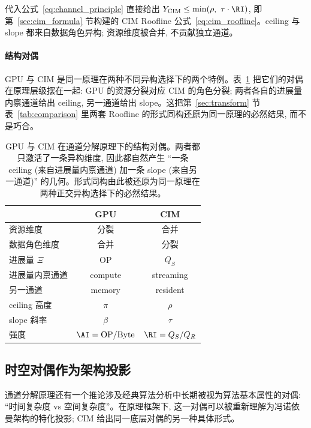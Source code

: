 代入公式~\eqref{eq:channel_principle} 直接给出 $Y_{\mathrm{CIM}} \le \min(\rho,\ \tau \cdot \RI)$, 即第~\ref{sec:cim_formula} 节构建的 CIM Roofline 公式~\eqref{eq:cim_roofline}。ceiling 与 slope 都来自数据角色异构; 资源维度被合并, 不贡献独立通道。

\paragraph{结构对偶}
GPU 与 CIM 是同一原理在两种不同异构选择下的两个特例。表~\ref{tab:dual_projections} 把它们的对偶在原理层级摆在一起: GPU 的资源分裂对应 CIM 的角色分裂; 两者各自的进展量内禀通道给出 ceiling, 另一通道给出 slope。这把第~\ref{sec:transform} 节表~\ref{tab:comparison} 里两套 Roofline 的形式同构还原为同一原理的必然结果, 而不是巧合。

\begin{table}[h!]
\centering
\small
\renewcommand{\arraystretch}{1.3}
\begin{tabular}{@{} l c c @{}}
\toprule
& \textbf{GPU} & \textbf{CIM} \\
\midrule
资源维度          & 分裂          & 合并 \\
数据角色维度      & 合并          & 分裂 \\
\midrule
进展量 $\Xi$      & $\mathrm{OP}$ & $Q_S$ \\
进展量内禀通道    & compute       & streaming \\
另一通道          & memory        & resident \\
\midrule
ceiling 高度      & $\pi$         & $\rho$ \\
slope 斜率        & $\beta$       & $\tau$ \\
强度              & $\AI = \mathrm{OP}/\mathrm{Byte}$ & $\RI = Q_S/Q_R$ \\
\bottomrule
\end{tabular}
\caption{GPU 与 CIM 在通道分解原理下的结构对偶。两者都只激活了一条异构维度, 因此都自然产生 “一条 ceiling (来自进展量内禀通道) 加一条 slope (来自另一通道)” 的几何。形式同构由此被还原为同一原理在两种正交异构选择下的必然结果。}
\label{tab:dual_projections}
\end{table}

\subsection{时空对偶作为架构投影}
\label{sec:duality_projection}

通道分解原理还有一个推论涉及经典算法分析中长期被视为算法基本属性的对偶: “时间复杂度 vs 空间复杂度”。在原理框架下, 这一对偶可以被重新理解为冯诺依曼架构的特化投影; CIM 给出同一底层对偶的另一种具体形式。

